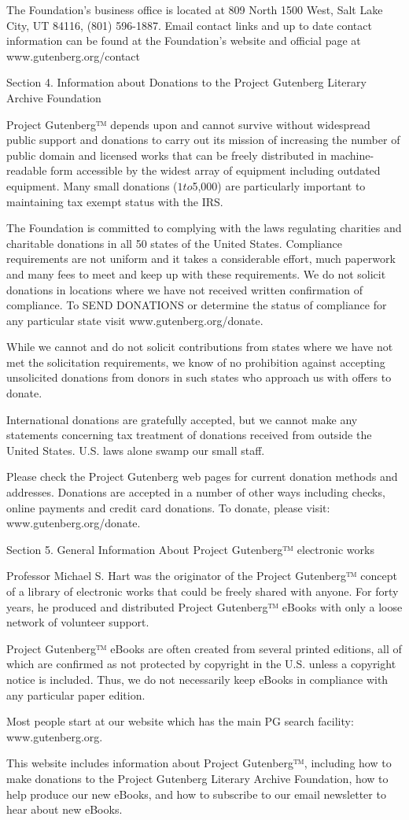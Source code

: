 The Foundation’s business office is located at 809 North 1500 West,
Salt Lake City, UT 84116, (801) 596-1887. Email contact links and up
to date contact information can be found at the Foundation’s website
and official page at www.gutenberg.org/contact

Section 4. Information about Donations to the Project Gutenberg
Literary Archive Foundation

Project Gutenberg™ depends upon and cannot survive without widespread
public support and donations to carry out its mission of
increasing the number of public domain and licensed works that can be
freely distributed in machine-readable form accessible by the widest
array of equipment including outdated equipment. Many small donations
($1 to $5,000) are particularly important to maintaining tax exempt
status with the IRS.

The Foundation is committed to complying with the laws regulating
charities and charitable donations in all 50 states of the United
States. Compliance requirements are not uniform and it takes a
considerable effort, much paperwork and many fees to meet and keep up
with these requirements. We do not solicit donations in locations
where we have not received written confirmation of compliance. To SEND
DONATIONS or determine the status of compliance for any particular state
visit www.gutenberg.org/donate.

While we cannot and do not solicit contributions from states where we
have not met the solicitation requirements, we know of no prohibition
against accepting unsolicited donations from donors in such states who
approach us with offers to donate.

International donations are gratefully accepted, but we cannot make
any statements concerning tax treatment of donations received from
outside the United States. U.S. laws alone swamp our small staff.

Please check the Project Gutenberg web pages for current donation
methods and addresses. Donations are accepted in a number of other
ways including checks, online payments and credit card donations. To
donate, please visit: www.gutenberg.org/donate.

Section 5. General Information About Project Gutenberg™ electronic works

Professor Michael S. Hart was the originator of the Project
Gutenberg™ concept of a library of electronic works that could be
freely shared with anyone. For forty years, he produced and
distributed Project Gutenberg™ eBooks with only a loose network of
volunteer support.

Project Gutenberg™ eBooks are often created from several printed
editions, all of which are confirmed as not protected by copyright in
the U.S. unless a copyright notice is included. Thus, we do not
necessarily keep eBooks in compliance with any particular paper
edition.

Most people start at our website which has the main PG search
facility: www.gutenberg.org.

This website includes information about Project Gutenberg™,
including how to make donations to the Project Gutenberg Literary
Archive Foundation, how to help produce our new eBooks, and how to
subscribe to our email newsletter to hear about new eBooks.
